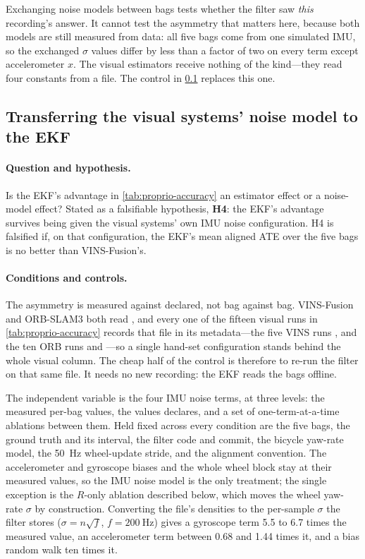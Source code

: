 \begin{queried}
Exchanging noise models between bags tests whether the filter saw \emph{this}
recording's answer. It cannot test the asymmetry that matters here, because both
models are still measured from data: all five bags come from one simulated IMU, so
the exchanged $\sigma$ values differ by less than a factor of two on every term
except accelerometer $x$. The visual estimators receive nothing of the kind---they
read four constants from a file. The control in \cref{sec:proprio-tuning} replaces
this one.
\end{queried}

\subsection{Transferring the visual systems' noise model to the EKF}
\label{sec:proprio-tuning}

\paragraph{Question and hypothesis.}
Is the EKF's advantage in \cref{tab:proprio-accuracy} an estimator effect or a
noise-model effect? Stated as a falsifiable hypothesis, \textbf{H4}: the EKF's
advantage survives being given the visual systems' own IMU noise configuration.
H4 is falsified if, on that configuration, the EKF's mean aligned ATE over the
five bags is no better than VINS-Fusion's.

\paragraph{Conditions and controls.}
The asymmetry is measured against declared, not bag against bag. VINS-Fusion and
ORB-SLAM3 both read , and every one of the
fifteen visual runs in \cref{tab:proprio-accuracy} records that file in its
metadata---the five VINS runs , and the ten ORB runs
 and ---so a single hand-set configuration stands behind the
whole visual column. The cheap half of the control is therefore to re-run the
filter on that same file. It needs no new recording: the EKF reads the bags
offline.

The independent variable is the four IMU noise terms, at three levels: the
measured per-bag values, the values  declares, and a set of
one-term-at-a-time ablations between them. Held fixed across every condition are
the five bags, the ground truth and its interval, the filter code and commit, the
bicycle yaw-rate model, the \SI{50}{\hertz} wheel-update stride, and the
alignment convention. The accelerometer and gyroscope biases and the whole wheel
block stay at their measured values, so the IMU noise model is the only treatment;
the single exception is the $R$-only ablation described below, which moves the
wheel yaw-rate $\sigma$ by construction. Converting the file's densities to the
per-sample $\sigma$ the filter stores ($\sigma = n\sqrt{f}$,
$f = \SI{200}{\hertz}$) gives a gyroscope term 5.5 to 6.7 times the measured
value, an accelerometer term between 0.68 and 1.44 times it, and a bias random
walk ten times it.

